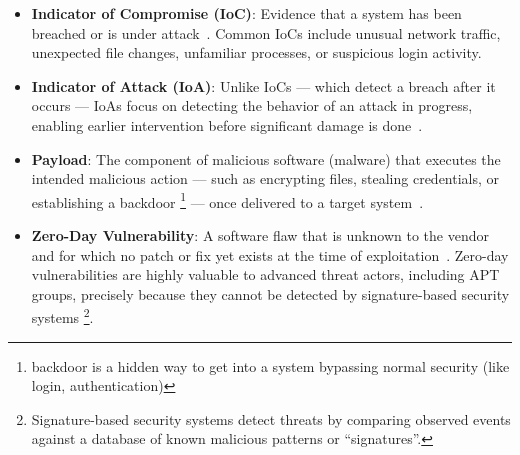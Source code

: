\begin{itemize}
\begin{itemize}
        \item \textit{Insider Threats}: Employees or contractors who misuse their access, intentionally or accidentally.
        \item \textit{Hacktivists}: Groups motivated by political or ideological goals.
    \end{itemize}
\item \textbf{Indicator of Compromise (IoC)}: Evidence that a system has been breached or is under attack~\cite{crowdstrike2024ioa}. Common IoCs include unusual network traffic, unexpected file changes, unfamiliar processes, or suspicious login activity.
      \item \textbf{Indicator of Attack (IoA)}: Unlike IoCs --- which detect a breach after it occurs --- IoAs focus on detecting the behavior of an attack in progress, enabling earlier intervention before significant damage is done~\cite{crowdstrike2024ioa}.
\end{itemize}


\begin{itemize}
      \item \textbf{Payload}: The component of malicious software (malware) that executes the intended malicious action --- such as encrypting files, stealing credentials, or establishing a backdoor \footnote{backdoor is a hidden way to get into a system bypassing normal security (like login, authentication)} --- once delivered to a target system~\cite{cloudflare2024payload}.
      \item \textbf{Zero-Day Vulnerability}: A software flaw that is unknown to the vendor and for which no patch or fix yet exists at the time of exploitation~\cite{deepinstinct2023zeroday}. Zero-day vulnerabilities are highly valuable to advanced threat actors, including APT groups, precisely because they cannot be detected by signature-based security systems \footnote{Signature-based security systems detect threats by comparing observed events against a database of known malicious patterns or ``signatures''.}.
\end{itemize}


